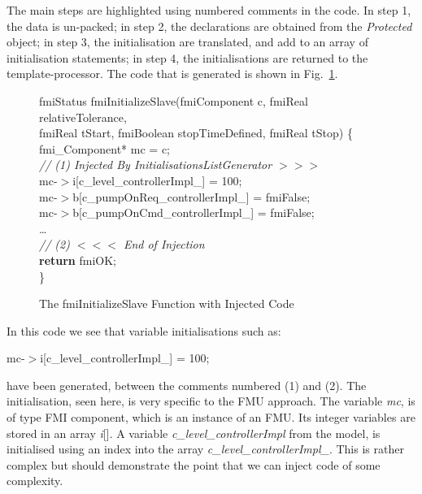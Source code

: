 \documentclass{llncs}%
\begin{document}
The main steps are highlighted using numbered comments in the code. In step 1, the data is un-packed; in step 2, the declarations are obtained from the \emph{Protected} object; in step 3, the initialisation are translated, and add to an array of initialisation statements; in step 4, the initialisations are returned to the template-processor. The code that is generated is shown in Fig.~\ref{fig:codeOut}. 
%
\begin{figure}
\centering
\begin{minipage}{0.9\textwidth}
fmiStatus fmiInitializeSlave(fmiComponent c, fmiReal relativeTolerance,\\
\hspace*{0.6cm}fmiReal tStart, fmiBoolean stopTimeDefined, fmiReal tStop) \{\\
\hspace*{0.2cm}fmi\_Component* mc = c;\\
\hspace*{0.2cm}\emph{// (1) Injected By InitialisationsListGenerator $>>>$ }\\
\hspace*{0.2cm}mc-$>$i[c\_level\_controllerImpl\_] = 100;\\
\hspace*{0.2cm}mc-$>$b[c\_pumpOnReq\_controllerImpl\_] = fmiFalse;\\
\hspace*{0.2cm}mc-$>$b[c\_pumpOnCmd\_controllerImpl\_] = fmiFalse;\\
\hspace*{0.2cm}\ldots\\
\hspace*{0.2cm}\emph{// (2) $<<<$ End of Injection}\\
\hspace*{0.2cm}\textbf{return} fmiOK;\\
\}
\end{minipage}
\caption{The fmiInitializeSlave Function with Injected Code}
\label{fig:codeOut}
\end{figure}
%
In this code we see that variable initialisations such as:

\noindent\begin{minipage}{\textwidth}
\centering
mc-$>$i[c\_level\_controllerImpl\_] = 100;
\end{minipage}
have been generated, between the comments numbered (1) and (2). The initialisation, seen here, is very specific to the FMU approach. The variable \emph{mc}, is of type FMI component, which is an instance of an FMU. Its integer variables are stored in an array \emph{i}[]. A variable \emph{c\_level\_controllerImpl} from the model, is initialised using an index into the array \emph{c\_level\_controllerImpl\_}. This is rather complex but should demonstrate the point that we can inject code of some complexity.
\end{document}
